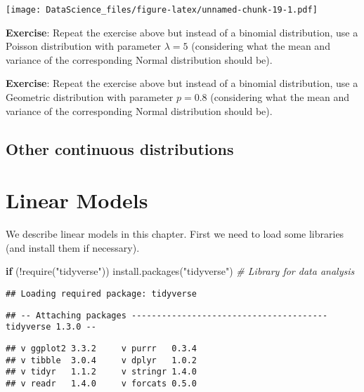 \documentclass[
]{book}
\newenvironment{Shaded}{\begin{snugshade}}{\end{snugshade}}
\newcommand{\CommentTok}[1]{\textcolor[rgb]{0.56,0.35,0.01}{\textit{#1}}}
\newcommand{\ControlFlowTok}[1]{\textcolor[rgb]{0.13,0.29,0.53}{\textbf{#1}}}
\newcommand{\FunctionTok}[1]{\textcolor[rgb]{0.00,0.00,0.00}{#1}}
\newcommand{\NormalTok}[1]{#1}
\newcommand{\SpecialCharTok}[1]{\textcolor[rgb]{0.00,0.00,0.00}{#1}}
\newcommand{\StringTok}[1]{\textcolor[rgb]{0.31,0.60,0.02}{#1}}
\begin{document}
\texttt{[image: DataScience\_files/figure-latex/unnamed-chunk-19-1.pdf]}

\textbf{Exercise}: Repeat the exercise above but instead of a binomial
distribution, use a Poisson distribution with parameter \(\lambda=5\) (considering what the mean and variance of the corresponding Normal distribution should be).

\textbf{Exercise}: Repeat the exercise above but instead of a binomial distribution, use a Geometric distribution with parameter \(p=0.8\) (considering what the mean and variance of the corresponding Normal distribution should be).

\hypertarget{other-continuous-distributions}{%
\section{Other continuous distributions}\label{other-continuous-distributions}}

\hypertarget{linear-models}{%
\chapter{Linear Models}\label{linear-models}}

We describe linear models in this chapter. First we need to load some libraries (and install them if necessary).

\begin{Shaded}
\begin{Highlighting}[]
\ControlFlowTok{if}\NormalTok{ (}\SpecialCharTok{!}\FunctionTok{require}\NormalTok{(}\StringTok{"tidyverse"}\NormalTok{)) }\FunctionTok{install.packages}\NormalTok{(}\StringTok{"tidyverse"}\NormalTok{) }\CommentTok{\# Library for data analysis}
\end{Highlighting}
\end{Shaded}

\begin{verbatim}
## Loading required package: tidyverse
\end{verbatim}

\begin{verbatim}
## -- Attaching packages --------------------------------------- tidyverse 1.3.0 --
\end{verbatim}

\begin{verbatim}
## v ggplot2 3.3.2     v purrr   0.3.4
## v tibble  3.0.4     v dplyr   1.0.2
## v tidyr   1.1.2     v stringr 1.4.0
## v readr   1.4.0     v forcats 0.5.0
\end{verbatim}
\end{document}
